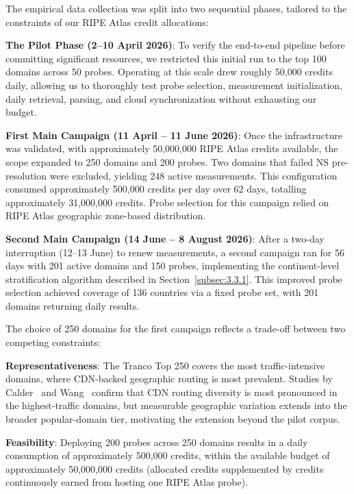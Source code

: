 The empirical data collection was split into two sequential phases, tailored to the constraints of our RIPE Atlas credit allocations:

\textbf{The Pilot Phase (2--10 April 2026)}: To verify the end-to-end pipeline before committing significant resources, we restricted this initial run to the top 100 domains across 50 probes. Operating at this scale drew roughly 50,000 credits daily, allowing us to thoroughly test probe selection, measurement initialization, daily retrieval, parsing, and cloud synchronization without exhausting our budget.

\textbf{First Main Campaign (11 April -- 11 June 2026)}: Once the infrastructure was validated, with approximately 50,000,000 RIPE Atlas credits available, the scope expanded to 250 domains and 200 probes. Two domains that failed \ac{NS} pre-resolution were excluded, yielding 248 active measurements. This configuration consumed approximately 500,000 credits per day over 62 days, totalling approximately 31,000,000 credits. Probe selection for this campaign relied on RIPE Atlas geographic zone-based distribution.

\textbf{Second Main Campaign (14 June -- 8 August 2026)}: After a two-day interruption (12--13 June) to renew measurements, a second campaign ran for 56 days with 201 active domains and 150 probes, implementing the continent-level stratification algorithm described in Section~\ref{subsec:3.3.1}. This improved probe selection achieved coverage of 136 countries via a fixed probe set, with 201 domains returning daily results.

The choice of 250 domains for the first campaign reflects a trade-off between two competing constraints:

\textbf{Representativeness}: The Tranco Top 250 covers the most traffic-intensive domains, where \ac{CDN}-backed geographic routing is most prevalent. Studies by Calder~\cite{Calder2015} and Wang~\cite{Wang2018} confirm that \ac{CDN} routing diversity is most pronounced in the highest-traffic domains, but measurable geographic variation extends into the broader popular-domain tier, motivating the extension beyond the pilot corpus.

\textbf{Feasibility}: Deploying 200 probes across 250 domains results in a daily consumption of approximately 500,000 credits, within the available budget of approximately 50,000,000 credits (allocated credits supplemented by credits continuously earned from hosting one RIPE Atlas probe).

